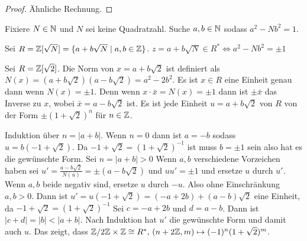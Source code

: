 \begin{proof}
    Ähnliche Rechnung.
\end{proof}
\begin{Bsp}
    Fixiere \(N\in \mathbb{N}\) und \(N\) sei keine Quadratzahl.
    Suche \(a,b\in\mathbb{N}\) sodass \(a^2-Nb^2=1\).
    
\end{Bsp}
\begin{Lemma} Sei \(R=\mathbb{Z}[\sqrt{N}]=\{a+b\sqrt{N}\mid a,b\in\mathbb{Z}\}\).
    \(z=a+b\sqrt{N}\in R^*\iff a^2-Nb^2=\pm 1\)
\end{Lemma}
\begin{Bsp}
    Sei \(R=\mathbb{Z}[\sqrt{2}]\). Die Norm von \(x=a+b\sqrt{2}\) ist definiert als 
    \(N(x)=(a+b\sqrt{2})(a-b\sqrt{2})=a^2-2b^2\).
    Es ist \(x\in R\) eine Einheit genau dann wenn \(N(x)=\pm 1\).
    Denn wenn \(x\cdot \bar x=N(x)=\pm 1\) dann ist \(\pm \bar x\) das Inverse zu \(x\), wobei 
    \(\bar x=a-b\sqrt{2}\) ist.
    Es ist jede Einheit \(u=a+b\sqrt{2}\) von \(R\) von der Form \(\pm (1+\sqrt{2})^n\) für \(n\in \mathbb{Z}\).
    
    Induktion über \(n=|a+b|\).
    Wenn \(n=0\) dann ist \(a=-b\) sodass \(u=b(-1+\sqrt{2})\). Da \(-1+\sqrt{2}=(1+\sqrt{2})^{-1}\) ist muss
    \(b=\pm 1\) sein also hat es die gewünschte Form.
    Sei \(n=|a+b|>0\)
    Wenn \(a,b\) verschiedene Vorzeichen haben sei \(u'=\frac{a-b\sqrt{2}}{N(u)}=\pm (a-b\sqrt{2})\)
    und \(uu'=\pm 1\) und ersetze \(u\) durch \(u'\).
    Wenn \(a,b\) beide negativ sind, ersetze \(u\) durch \(-u\).
    Also ohne Einschränkung \(a,b>0\). 
    Dann ist \(u'=u(-1+\sqrt{2})=(-a+2b)+(a-b)\sqrt{2}\) eine Einheit, da \(-1+\sqrt{2}=(1+\sqrt{2})^{-1}\)
    Sei \(c=-a+2b\) und \(d=a-b\). Dann ist \(|c+d|=|b|<|a+b|\).
    Nach Induktion hat \(u'\) die gewünschte Form und damit auch \(u\).
    Das zeigt, dass \(\mathbb{Z}/2\mathbb{Z}\times \mathbb{Z}\cong R^*,\, (n+2\mathbb{Z},m)\mapsto (-1)^n(1+\sqrt{2})^m\).
\end{Bsp}
